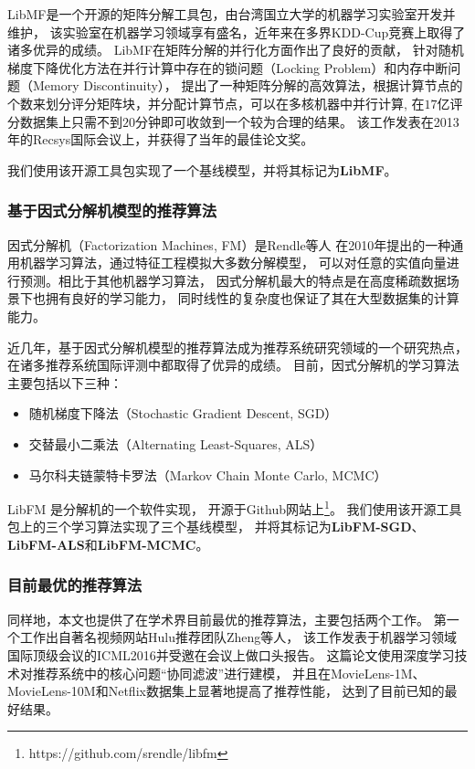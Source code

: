 LibMF是一个开源的矩阵分解工具包，由台湾国立大学的机器学习实验室开发并维护，
该实验室在机器学习领域享有盛名，近年来在多界KDD-Cup竞赛上取得了诸多优异的成绩。
LibMF在矩阵分解的并行化方面作出了良好的贡献，
针对随机梯度下降优化方法在并行计算中存在的锁问题（Locking Problem）和内存中断问题（Memory Discontinuity），
提出了一种矩阵分解的高效算法，根据计算节点的个数来划分评分矩阵块，并分配计算节点，可以在多核机器中并行计算,
在$17$亿评分数据集上只需不到$20$分钟即可收敛到一个较为合理的结果。
该工作\parencite{zhuang2013fast}发表在2013年的Recsys国际会议上，并获得了当年的最佳论文奖。

我们使用该开源工具包实现了一个基线模型，并将其标记为\textbf{LibMF}。

\subsubsection{基于因式分解机模型的推荐算法}
因式分解机（Factorization Machines, FM）是Rendle等人\parencite{rendle2010factorization}
在2010年提出的一种通用机器学习算法，通过特征工程模拟大多数分解模型，
可以对任意的实值向量进行预测。相比于其他机器学习算法，
因式分解机最大的特点是在高度稀疏数据场景下也拥有良好的学习能力，
同时线性的复杂度也保证了其在大型数据集的计算能力。

近几年，基于因式分解机模型的推荐算法成为推荐系统研究领域的一个研究热点，
在诸多推荐系统国际评测中都取得了优异的成绩。
目前，因式分解机的学习算法主要包括以下三种：
\begin{itemize}
\item 随机梯度下降法（Stochastic Gradient Descent, SGD）
\item 交替最小二乘法（Alternating Least-Squares, ALS）
\item 马尔科夫链蒙特卡罗法（Markov Chain Monte Carlo, MCMC）
\end{itemize}

LibFM \parencite{rendle2012factorization}是分解机的一个软件实现，
开源于Github网站上\footnote{https://github.com/srendle/libfm}。
我们使用该开源工具包上的三个学习算法实现了三个基线模型，
并将其标记为\textbf{LibFM-SGD}、\textbf{LibFM-ALS}和\textbf{LibFM-MCMC}。

\subsubsection{目前最优的推荐算法}
同样地，本文也提供了在学术界目前最优的推荐算法，主要包括两个工作。
第一个工作出自著名视频网站Hulu推荐团队Zheng等人\parencite{zheng2016neural}，
该工作发表于机器学习领域国际顶级会议的ICML2016并受邀在会议上做口头报告。
这篇论文使用深度学习技术对推荐系统中的核心问题``协同滤波''进行建模，
并且在MovieLens-1M、MovieLens-10M和Netflix数据集上显著地提高了推荐性能，
达到了目前已知的最好结果。

